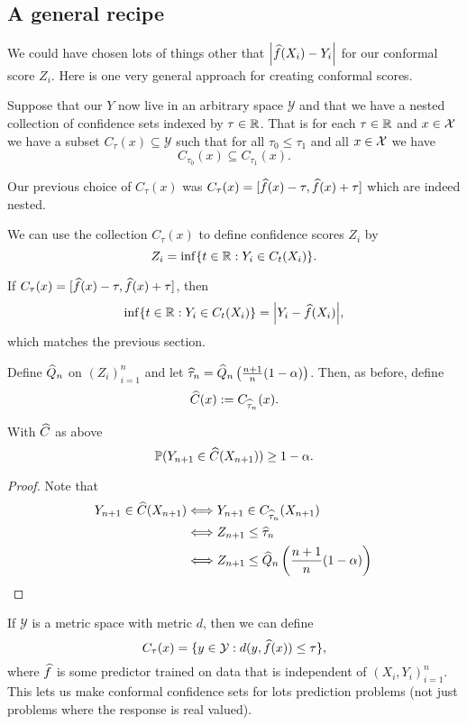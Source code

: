 \subsection{A general recipe}
We could have chosen lots of things other that ${\left\lvert\widehat{f}(X_i)-Y_i\right\rvert}$ for our conformal score $Z_i$. Here is one very general approach for creating conformal scores.

Suppose that our $Y$ now live in an arbitrary space $\mathcal{Y}$ and that we have a nested collection of confidence sets indexed by $\tau \in {\mathbb R}$. That is for each $\tau \in {\mathbb R}$ and $x \in {\mathcal{X}}$ we have a subset $C_\tau(x) \subseteq \mathcal{Y}$ such that for all $\tau_0 \le \tau_1$ and all $x \in {\mathcal{X}}$ we have
\[C_{\tau_0}(x) \subseteq C_{\tau_1}(x). \]
\begin{ex}
    Our previous choice of $C_\tau(x)$ was $C_\tau(x)=[\widehat{f}(x)-\tau, \widehat{f}(x)+\tau]$ which are indeed nested.
\end{ex}
We can use the collection $C_\tau(x)$ to define confidence scores $Z_i$ by
\[Z_i = \inf\{t\in {\mathbb R} : Y_i \in C_t(X_i)\}. \]
\begin{ex}
    If $C_\tau(x)=[\widehat{f}(x)-\tau, \widehat{f}(x)+\tau]$, then
    \[\inf\{t\in {\mathbb R} : Y_i \in C_t(X_i)\} = {\left\lvert Y_i-\widehat{f}(X_i)\right\rvert}, \]
    which matches the previous section.
\end{ex}
Define $\widehat{Q}_n$ on $(Z_i)_{i=1}^n$ and let $\widehat{\tau}_n = \widehat{Q}_n\left(\frac{n+1}{n}(1-{\alpha})\right)$. Then, as before, define
\[\widehat{C}(x):= C_{\widehat{\tau}_n}(x). \]
\begin{thrm}
    With $\widehat{C}$ as above
    \[{\mathbb{P}}(Y_{n+1}\in \widehat{C}(X_{n+1})) \ge 1-{\alpha}.\]
\end{thrm}
\begin{proof}
    Note that
    \begin{align*}
        Y_{n+1} \in \widehat{C}(X_{n+1})&\Longleftrightarrow Y_{n+1} \in C_{\widehat{\tau}_n}(X_{n+1})\\
        &\Longleftrightarrow Z_{n+1} \le \widehat{\tau}_n \\
        & \Longleftrightarrow Z_{n+1} \le \widehat{Q}_n\left(\frac{n+1}{n}(1-{\alpha})\right) \qedhere
    \end{align*}
\end{proof}
\begin{ex}
    If $\mathcal{Y}$ is a metric space with metric $d$, then we can define 
    \[C_\tau(x) = \{y \in \mathcal{Y} : d(y,\widehat{f}(x)) \le \tau\}, \]
    where $\widehat{f}$ is some predictor trained on data that is independent of $(X_i,Y_i)_{i=1}^n$. This lets us make conformal confidence sets for lots prediction problems (not just problems where the response is real valued).
\end{ex}

